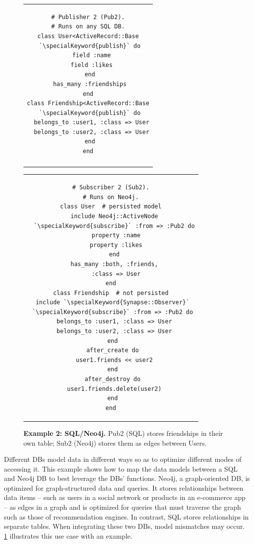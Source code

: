 \begin{figure}
\begin{tabular}{c}
\begin{minipage}{.23\textwidth}
\begin{lstlisting}[xleftmargin=3pt]
# Publisher 2 (Pub2).
# Runs on any SQL DB.
class User<ActiveRecord::Base
 `\specialKeyword{publish}` do
  field :name
  field :likes
 end
 has_many :friendships
end
class Friendship<ActiveRecord::Base
 `\specialKeyword{publish}` do
  belongs_to :user1, :class => User
  belongs_to :user2, :class => User
 end
end
\end{lstlisting}
\end{minipage}\\
\begin{minipage}{.21\textwidth}
\vspace{0.2cm}
\caption{{\bf Example 2: SQL/Neo4j.}
Pub2 (SQL) stores friendships in their own table; Sub2 (Neo4j) stores
them as edges between Users. }
\vspace{-0.2cm}
\label{synapse:fig:sql-to-neo4j}
\end{minipage}
\end{tabular}\hfill
\begin{tabular}{c}
\begin{minipage}{.21\textwidth}
\begin{lstlisting}
# Subscriber 2 (Sub2).
# Runs on Neo4j.
class User  # persisted model
  include Neo4j::ActiveNode
  `\specialKeyword{subscribe}` :from => :Pub2 do
   property :name
   property :likes
  end
  has_many :both, :friends,
   :class => User
end
class Friendship  # not persisted
 include `\specialKeyword{Synapse::Observer}`
 `\specialKeyword{subscribe}` :from => :Pub2 do
  belongs_to :user1, :class => User
  belongs_to :user2, :class => User
 end
 after_create do
  user1.friends << user2
 end
 after_destroy do
  user1.friends.delete(user2)
 end
end
\end{lstlisting}
\end{minipage}
\end{tabular}
\end{figure}

Different DBs model data in different ways so as to optimize different modes of
accessing it. This example shows how to map the data models between a SQL and
Neo4j DB to best leverage the DBs' functions.  Neo4j, a graph-oriented DB, is
optimized for graph-structured data and queries. It stores relationships between
data items -- such as users in a social network or products in an e-commerce app
-- as edges in a graph and is optimized for queries that must traverse the graph
such as those of recommendation engines. In contrast, SQL stores relationships
in separate tables. When integrating these two DBs, model mismatches may occur.
\F\ref{synapse:fig:sql-to-neo4j} illustrates this use case with an example.

